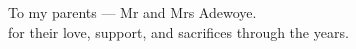 
\begin{dedication} 

To my parents — Mr and Mrs Adewoye.\\
for their love, support, and sacrifices through the years. 

\end{dedication}

